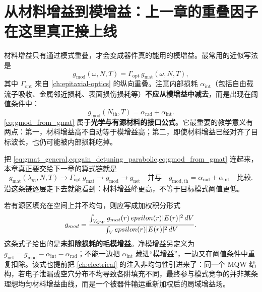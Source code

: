 \section{从材料增益到模增益：上一章的重叠因子在这里真正接上线}
材料增益只有通过模式重叠，才会变成器件真的能用的模增益。最常用的近似写法是
\begin{equation}
 g_{\mathrm{mod}}(\omega,N,T)
 =
 \Gamma_{\mathrm{opt}}\,g_{\mathrm{mat}}(\omega,N,T),
\label{eq:gmod_from_gmat}
\end{equation}
其中 $\Gamma_{\mathrm{opt}}$ 来自 \cref{ch:epitaxial-optics} 的纵向重叠。注意内部损耗 $\alpha_{\mathrm{int}}$（包括自由载流子吸收、金属邻近损耗、表面损伤损耗等）\textbf{不应从模增益中减去}，而是出现在阈值条件中：
\begin{equation}
g_{\mathrm{mod}}(N_{\mathrm{th}},T) = \alpha_{\mathrm{rad}} + \alpha_{\mathrm{int}}.
\label{eq:threshold_condition_gain}
\end{equation}
\cref{eq:gmod_from_gmat} 属于\textbf{光学与有源材料的接口公式}。它最重要的教学意义有两点：第一，材料增益高不自动等于模增益高；第二，即使材料增益已经对齐了目标波长，也仍可能被内部损耗吃掉。

把 \cref{eq:gmat_general,eq:gain_detuning_parabolic,eq:gmod_from_gmat} 连起来，本章真正要交给下一章的算式链就是
\begin{equation}
g_{\mathrm{mat}}(\lambda_m,N,T)
\rightarrow
\Gamma_{\mathrm{opt}}\,g_{\mathrm{mat}}
\rightarrow
g_{\mathrm{mod}}
\rightarrow
g_{\mathrm{net}}
\quad\text{并与}\quad
g_{\mathrm{mod,th}}=\alpha_{\mathrm{rad}}+\alpha_{\mathrm{int}}
\quad\text{比较}.
\label{eq:gain_chain_compact}
\end{equation}
沿这条链逐层走下去就能看到：材料增益峰更高，不等于目标模式阈值更低。

若有源区填充在空间上并不均匀，则应写成加权积分形式
\begin{equation}
 g_{mod}
 =
 \frac{\int_{V_{QW}} g_{mat}(r)\,epsilon(r)|E(r)|^2\,d V}
 {\int_V epsilon(r)|E(r)|^2\,d V}.
\label{eq:gmod_spatial}
\end{equation}
这条式子给出的是\textbf{未扣除损耗的毛模增益}。净模增益另定义为 $g_{\mathrm{net}}=g_{\mathrm{mod}}-\alpha_{\mathrm{int}}-\alpha_{\mathrm{rad}}$；不能一边把 $\alpha_{\mathrm{int}}$ 藏进“模增益”，一边又在阈值条件中重复扣除。该式也提前把 \cref{ch:electrical} 的注入非均匀性引进来了：同一个 MQW 结构，若电子泄漏或空穴分布不均导致各阱填充不同，最终参与模式竞争的并非某条理想均匀材料增益曲线，而是一个被器件输运重新加权后的局域增益场。

